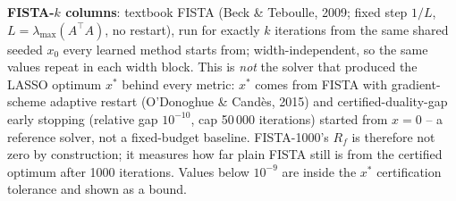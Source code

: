 \begin{table}[htbp]
\begin{minipage}{\linewidth}
\textbf{FISTA-$k$ columns}: textbook FISTA (Beck \& Teboulle, 2009; fixed step $1/L$, $L = \lambda_{\max}(A^\top A)$, no restart), run for exactly $k$ iterations from the same shared seeded $x_0$ every learned method starts from; width-independent, so the same values repeat in each width block. This is \emph{not} the solver that produced the LASSO optimum $x^*$ behind every metric: $x^*$ comes from FISTA with gradient-scheme adaptive restart (O'Donoghue \& Cand\`es, 2015) and certified-duality-gap early stopping (relative gap $10^{-10}$, cap 50\,000 iterations) started from $x = 0$ -- a reference solver, not a fixed-budget baseline. FISTA-1000's $R_f$ is therefore not zero by construction; it measures how far plain FISTA still is from the certified optimum after 1000 iterations. Values below $10^{-9}$ are inside the $x^*$ certification tolerance and shown as a bound.
\end{minipage}
\end{table}

